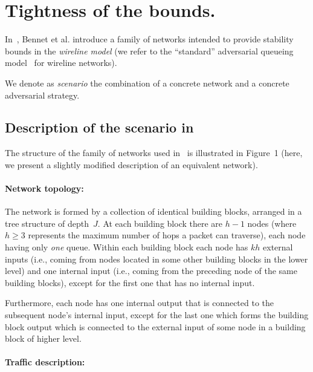 \documentclass[journal,twocolumn]{./IEEEtran}
\begin{document}
\section{Tightness of the bounds.}



In~\cite{DBLP:journals/ton/BennettBCCB02}, Bennet et al. introduce a family of networks  intended to provide stability bounds in the \emph{wireline model} (we refer to the ``standard'' adversarial queueing model~\cite{aafkll01} for wireline networks). 

We denote as \emph{scenario} the combination of a concrete network and a concrete adversarial strategy.


\subsection{Description of the scenario in~\cite{DBLP:journals/ton/BennettBCCB02}}
\label{subsec:scenario}

The structure of the family of networks used in~\cite{DBLP:journals/ton/BennettBCCB02} is illustrated in Figure~1 (here, we present a slightly modified description of an equivalent network).


\paragraph{Network topology:}

The network is formed by a collection of identical building blocks, arranged in a tree structure of depth~$J$. At each building block there are $h-1$ nodes (where $h \geq 3$ represents the maximum number of hops a packet can traverse), each node having only \emph{one} queue.  Within each building block each node has $kh$ external inputs (i.e., coming from nodes located in some other building blocks in the lower level) and one internal input (i.e., coming from the preceding node of the same building blocks), except for the first one that has no internal input.

Furthermore, each node has one internal output that is connected to the subsequent node's internal input, except for the last one which forms the building block output which is connected to the external input of some node in a building block of higher level.


\paragraph{Traffic description:}
\end{document}
